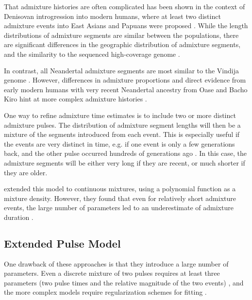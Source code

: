 \documentclass[11pt]{article}
\begin{document}
That admixture histories are often complicated has been shown in the context of Denisovan introgression into modern humans, where at least two distinct admixture events into East Asians and Papuans were proposed \citep{browning_analysis_2018, jacobs_multiple_2019}. While the length distributions of admixture segments are similar between the populations, there are significant differences in the geographic distribution of admixture segments, and the similarity to the sequenced high-coverage genome \citep{browning_analysis_2018, massilani_denisovan_2020}. 

In contrast, all Neandertal admixture segments are most similar to the Vindija genome \citep{prufer_high-coverage_2017}. However, differences in admixture proportions \citep{meyer_high-coverage_2012, wall_higher_2013,kim_selection_2015,vernot_complex_2015,villanea_multiple_2019} and direct evidence from early modern humans with very recent Neandertal ancestry from Oase and Bacho Kiro hint at more complex admixture histories \citep{fu_early_2015,hajdinjak_initial_2021}.


One way to refine admixture time estimates is to include two or more distinct admixture pulses. The distribution of admixture segment lengths will then be a mixture of the segments introduced from each event. This is especially useful if the events are very distinct in time, e.g. if one event is only a few generations back, and the other pulse occurred hundreds of generations ago \citep{fu_genome_2014, fu_early_2015}. In this case, the admixture segments will be either very long if they are recent, or much shorter if they are older.

\cite{zhou_modeling_2017} extended this model to continuous mixtures, using a polynomial function as a mixture density. However, they found that even for relatively short admixture events, the large number of parameters led to an underestimate of admixture duration \citep{zhou_inference_2017}. 
\subsection{Extended Pulse Model}
One drawback of  these approaches is that they introduce a large number of parameters. Even a discrete mixture of two pulses requires at least three parameters (two pulse times and the relative magnitude of the two events) \citep{pickrell_ancient_2014}, and the more complex models require regularization schemes for fitting \citep{zhou_inference_2017, ralph_geography_2013}.
\end{document}
